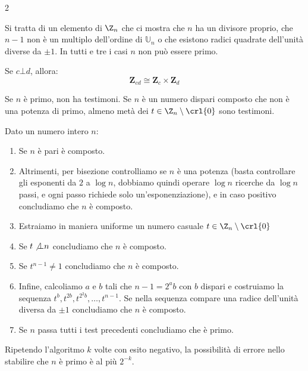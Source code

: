 \documentclass[\main/main.tex]{subfiles}
\begin{document}
\begin{multicols}{2}
\begin{definition}
    Si tratta di un elemento di \(\Z_n\) che ci mostra che \(n\) ha un divisore proprio, che \(n-1\) non è un multiplo dell'ordine di \(\mathbb{U}_n\) o che esistono radici quadrate dell'unità diverse da \(\pm 1\). In tutti e tre i casi \(n\) non può essere primo.
\end{definition}
\vfill\null
\columnbreak
\begin{theorem}
    Se \(c \bot d\), allora:
    \[\mathbf{Z}_{c d} \cong \mathbf{Z}_{c} \times \mathbf{Z}_{d}\]
\end{theorem}

\begin{theorem}
    Se \(n\) è primo, non ha testimoni. Se \(n\) è un numero dispari composto che non è una potenza di primo, almeno metà dei \(t \in \Z_n \setminus \crl{0}\) sono testimoni.
\end{theorem}
\begin{definition}
    Dato un numero intero \(n\):
    \begin{enumerate}
        \item Se \(n\) è pari è composto.
        \item Altrimenti, per bisezione controlliamo se \(n\) è una potenza (basta controllare gli esponenti da \(2\) a \(\log n\), dobbiamo quindi operare \(\log n\) ricerche da \(\log n\) passi, e ogni passo richiede solo un'esponenziazione), e in caso positivo concludiamo che \(n\) è composto.
        \item Estraiamo in maniera uniforme un numero casuale \(t \in \Z_n \setminus \crl{0}\)
        \item Se \(t \not\bot n\) concludiamo che \(n\) è composto.
        \item Se \(t^{n-1} \neq 1\) concludiamo che \(n\) è composto.
        \item Infine, calcoliamo \(a\) e \(b\) tali che \(n-1=2^{a} b\) con \(b\) dispari e costruiamo la sequenza \(t^{b}, t^{2 b}, t^{2^{2} b}, \ldots, t^{n-1}\). Se nella sequenza compare una radice dell'unità diversa da \(\pm 1\) concludiamo che \(n\) è composto.
        \item Se \(n\) passa tutti i test precedenti concludiamo che è primo.
    \end{enumerate}
    Ripetendo l'algoritmo \(k\) volte con esito negativo, la possibilità di errore nello stabilire che \(n\) è primo è al più \(2^{-k}\).
\end{definition}
\end{multicols}
\end{document}
